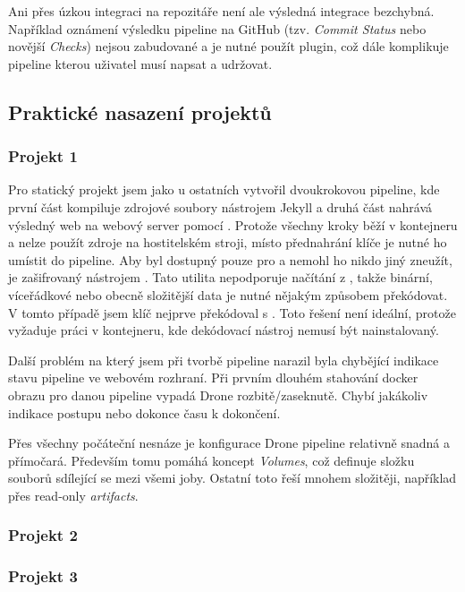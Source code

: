         Ani přes úzkou integraci na repozitáře není ale výsledná integrace bezchybná. Například oznámení výsledku pipeline na GitHub (tzv. \textit{Commit Status} nebo novější \textit{Checks}) nejsou zabudované a je nutné použít plugin, což dále komplikuje pipeline kterou uživatel musí napsat a udržovat.

        \blind[1]

    \subsection{Praktické nasazení projektů}
        \subsubsection{Projekt 1}
            Pro statický projekt jsem jako u ostatních \CI vytvořil dvoukrokovou pipeline, kde první část kompiluje zdrojové soubory nástrojem Jekyll a druhá část nahrává výsledný web na webový server pomocí . Protože všechny kroky běží v kontejneru a nelze použít zdroje na hostitelském stroji, místo přednahrání  klíče je nutné ho umístit do pipeline. Aby byl dostupný pouze pro \CI a nemohl ho nikdo jiný zneužít, je zašifrovaný  nástrojem . Tato utilita nepodporuje načítání z , takže binární, víceřádkové nebo obecně složitější data je nutné nějakým způsobem překódovat. V tomto případě jsem klíč nejprve překódoval s . Toto řešení není ideální, protože vyžaduje práci v kontejneru, kde dekódovací nástroj nemusí být nainstalovaný.

            Další problém na který jsem při tvorbě pipeline narazil byla chybějící indikace stavu pipeline ve webovém rozhraní. Při prvním dlouhém stahování docker obrazu pro danou pipeline vypadá Drone rozbitě/zaseknutě. Chybí jakákoliv indikace postupu nebo dokonce času k dokončení.

            Přes všechny počáteční nesnáze je konfigurace Drone pipeline relativně snadná a přímočará. Především tomu pomáhá koncept \textit{Volumes}, což definuje složku souborů sdílející se mezi všemi joby. Ostatní \CI toto řeší mnohem složitěji, například přes read-only \textit{artifacts}.

        \subsubsection{Projekt 2}
            \blind[2]

        \subsubsection{Projekt 3}
            \blind[2]
